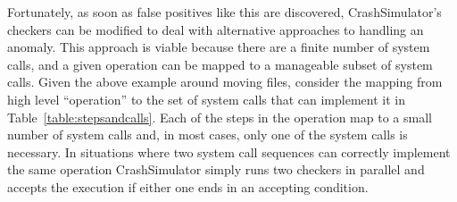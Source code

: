 Fortunately, as soon as false positives like this are discovered,
CrashSimulator's checkers can be modified to deal with alternative
approaches to handling an anomaly.
This approach is viable because there are a finite number of system calls, and a
given operation can be mapped to a manageable subset of system calls.  Given the
above example around moving files, consider the mapping from high level
``operation'' to the set of system calls that can implement it in
Table~\ref{table:stepsandcalls}.  Each of the steps in the operation map to a small
number of system calls and, in most cases, only one of the system calls is
necessary.  In situations where two system call sequences can correctly
implement the same operation CrashSimulator simply runs two checkers
in parallel and accepts the execution if either one ends in an accepting
condition.

